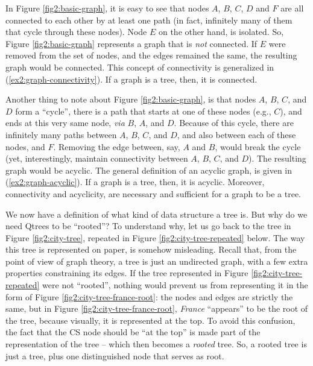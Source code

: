 In Figure \ref{fig2:basic-graph}, it is easy to see that nodes $A$, $B$, $C$, $D$ and $F$ are all connected to each other by at least one path (in fact, infinitely many of them that cycle through these nodes). Node $E$ on the other hand, is isolated. So, Figure \ref{fig2:basic-graph} represents a graph that is \textit{not} connected. If $E$ were removed from the set of nodes, and the edges remained the same, the resulting graph would be connected. This concept of connectivity is generalized in (\ref{ex2:graph-connectivity}). If a graph is a tree, then, it is connected.
\begin{exe}
	\label{ex2:graph-connectivity}
\end{exe}

Another thing to note about Figure \ref{fig2:basic-graph}, is that nodes $A$, $B$, $C$, and $D$ form a ``cycle'', there is a path that starts at one of these nodes (e.g., $C$), and ends at this very same node, \textit{via} $B$, $A$, and $D$. Because of this cycle, there are infinitely many paths between $A$, $B$, $C$, and $D$, and also between each of these nodes, and $F$. Removing the edge between, say, $A$ and $B$, would break the cycle (yet, interestingly, maintain connectivity between $A$, $B$, $C$, and $D$). The resulting graph would be acyclic. The general definition of an acyclic graph, is given in (\ref{ex2:graph-acyclic}). If a graph is a tree, then, it is acyclic. Moreover, connectivity and acyclicity, are necessary and sufficient for a graph to be a tree.

\begin{exe}
	\label{ex2:graph-acyclic}
\end{exe}

We now have a definition of what kind of data structure a tree is. But why do we need  Qtrees to be ``rooted''? To understand why, let us go back to the tree in Figure \ref{fig2:city-tree}, repeated in Figure \ref{fig2:city-tree-repeated} below. The way this tree is represented on paper, is somehow misleading. Recall that, from the point of view of graph theory, a tree is just an undirected graph, with a few extra properties constraining its edges. If the tree represented in Figure \ref{fig2:city-tree-repeated} were not ``rooted'', nothing would prevent us from representing it in the form of Figure \ref{fig2:city-tree-france-root}: the nodes and edges are strictly the same, but in Figure \ref{fig2:city-tree-france-root}, \textit{France} ``appears'' to be the root of the tree, because visually, it is represented at the top. To avoid this confusion, the fact that the CS node should be ``at the top'' is made part of the representation of the tree -- which then becomes a \textit{rooted} tree. So, a rooted tree is just a tree, plus one distinguished node that serves as root.

